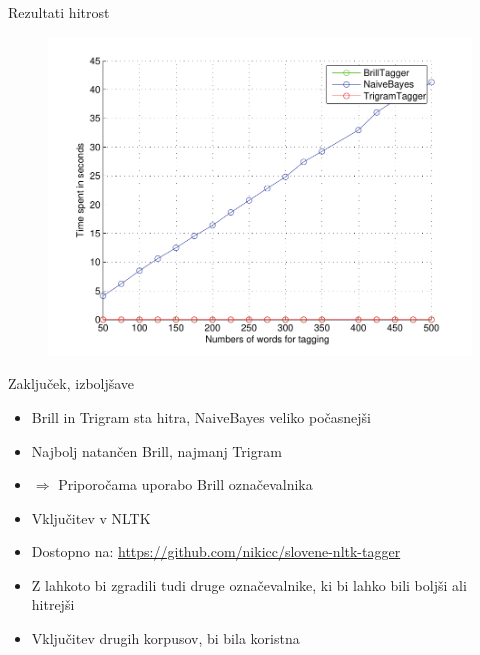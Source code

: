 \documentclass{beamer}
\begin{document}
\begin{frame}{Rezultati hitrost}
\begin{figure}[h]
\begin{center}
\includegraphics[height=0.85\textheight]{../evaluation/graph_speed.pdf} 
\end{center}
\end{figure}
\end{frame}

\begin{frame}{Zaključek, izboljšave}
\begin{itemize}
\item Brill in Trigram sta hitra, NaiveBayes veliko počasnejši
\item Najbolj natančen Brill, najmanj Trigram
\item $\Rightarrow$ Priporočama uporabo Brill označevalnika
\item Vključitev v NLTK
\item Dostopno na: \url{https://github.com/nikicc/slovene-nltk-tagger}
\end{itemize}
 
\begin{itemize}
\item Z lahkoto bi zgradili tudi druge označevalnike, ki bi lahko bili boljši ali hitrejši
\item Vključitev drugih korpusov, bi bila koristna
\end{itemize}
\end{frame}
\end{document}
